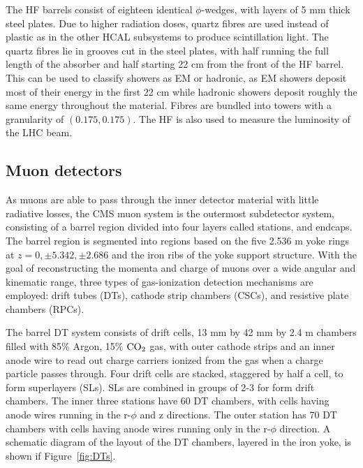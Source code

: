 \indent The HF barrels consist of eighteen identical $\phi$-wedges, with layers of 5 mm thick steel plates. Due to higher radiation doses, quartz fibres are used instead of plastic as in the other HCAL subsystems to produce scintillation light. The quartz fibres lie in grooves cut in the steel plates, with half running the full length of the absorber and half starting 22 cm from the front of the HF barrel. This can be used to classify showers as EM or hadronic, as EM showers deposit most of their energy in the first 22 cm while hadronic showers deposit roughly the same energy throughout the material. Fibres are bundled into towers with a granularity of $(0.175, 0.175)$. The HF is also used to measure the luminosity of the LHC beam.

\subsection{Muon detectors}

As muons are able to pass through the inner detector material with little radiative losses, the CMS muon system is the outermost subdetector system, consisting of a barrel region divided into four layers called stations, and endcaps. The barrel region is segmented into regions based on the five 2.536 m yoke rings at $z = 0, \pm5.342, \pm2.686$ and the iron ribs of the yoke support structure. With the goal of reconstructing the momenta and charge of muons over a wide angular and kinematic range, three types of gas-ionization detection mechanisms are employed: drift tubes (DTs), cathode strip chambers (CSCs), and resistive plate chambers (RPCs). 

\indent The barrel DT system consists of drift cells, 13 mm by 42 mm by 2.4 m chambers filled with 85\% Argon, 15\% $\rm{CO}_2$ gas, with outer cathode strips and an inner anode wire to read out charge carriers ionized from the gas when a charge particle passes through. Four drift cells are stacked, staggered by half a cell, to form superlayers (SLs). SLs are combined in groups of 2-3 for form drift chambers. The inner three stations have 60 DT chambers, with cells having anode wires running in the r-$\phi$ and z directions. The outer station has 70 DT chambers with cells having anode wires running only in the r-$\phi$ direction. A schematic diagram of the layout of the DT chambers, layered in the iron yoke, is shown if Figure~\ref{fig:DTs}.

